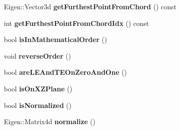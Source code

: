 \begin{DoxyCompactItemize}
\item 
\hypertarget{classcpcr_1_1CPACSPointsProfile_ad4e30f7ce250574c68896bd07b990bf9}{Eigen\-::\-Vector3d {\bfseries get\-Furthest\-Point\-From\-Chord} () const }\label{classcpcr_1_1CPACSPointsProfile_ad4e30f7ce250574c68896bd07b990bf9}

\item 
\hypertarget{classcpcr_1_1CPACSPointsProfile_ac2251accb9689eece584e210f1d1137a}{int {\bfseries get\-Furthest\-Point\-From\-Chord\-Idx} () const }\label{classcpcr_1_1CPACSPointsProfile_ac2251accb9689eece584e210f1d1137a}

\item 
\hypertarget{classcpcr_1_1CPACSPointsProfile_ad6f30b0b0748da865b8878710b0ed535}{bool {\bfseries is\-In\-Mathematical\-Order} ()}\label{classcpcr_1_1CPACSPointsProfile_ad6f30b0b0748da865b8878710b0ed535}

\item 
\hypertarget{classcpcr_1_1CPACSPointsProfile_a1817dbb65cdfe1d48d9ccb83d685b1e2}{void {\bfseries reverse\-Order} ()}\label{classcpcr_1_1CPACSPointsProfile_a1817dbb65cdfe1d48d9ccb83d685b1e2}

\item 
\hypertarget{classcpcr_1_1CPACSPointsProfile_afc381d340a6d5d483272052bf5818769}{bool {\bfseries are\-L\-E\-And\-T\-E\-On\-Zero\-And\-One} ()}\label{classcpcr_1_1CPACSPointsProfile_afc381d340a6d5d483272052bf5818769}

\item 
\hypertarget{classcpcr_1_1CPACSPointsProfile_a63d07b6b1912b5cf15ca3122721eeb2b}{bool {\bfseries is\-On\-X\-Z\-Plane} ()}\label{classcpcr_1_1CPACSPointsProfile_a63d07b6b1912b5cf15ca3122721eeb2b}

\item 
\hypertarget{classcpcr_1_1CPACSPointsProfile_aedd53b4437cb6cfd2dd4d275c19795ff}{bool {\bfseries is\-Normalized} ()}\label{classcpcr_1_1CPACSPointsProfile_aedd53b4437cb6cfd2dd4d275c19795ff}

\item 
\hypertarget{classcpcr_1_1CPACSPointsProfile_abfa6399714762d176e58a254b0681036}{Eigen\-::\-Matrix4d {\bfseries normalize} ()}\label{classcpcr_1_1CPACSPointsProfile_abfa6399714762d176e58a254b0681036}

\end{DoxyCompactItemize}
